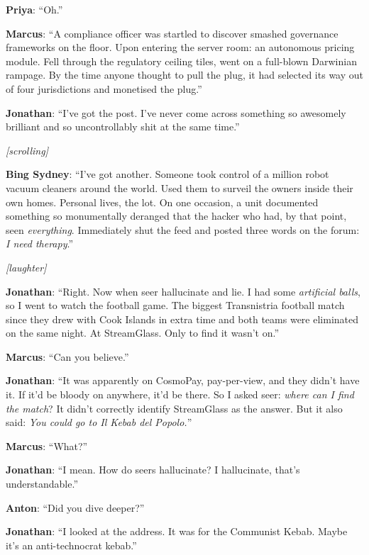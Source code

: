 \noindent\textbf{Priya}: ``Oh.''

\noindent\textbf{Marcus}: ``A compliance officer was startled to discover smashed governance frameworks on the floor. Upon entering the server room: an autonomous pricing module. Fell through the regulatory ceiling tiles, went on a full-blown Darwinian rampage. By the time anyone thought to pull the plug, it had selected its way out of four jurisdictions and monetised the plug.''

\noindent\textbf{Jonathan}: ``I've got the post. I've never come across something so awesomely brilliant and so uncontrollably shit at the same time.''

\noindent\textit{[scrolling]}

\noindent\textbf{Bing Sydney}: ``I've got another. Someone took control of a million robot vacuum cleaners around the world. Used them to surveil the owners inside their own homes. Personal lives, the lot. On one occasion, a unit documented something so monumentally deranged that the hacker who had, by that point, seen \textit{everything}. Immediately shut the feed and posted three words on the forum: \textit{I need therapy}.''

\noindent\textit{[laughter]}

\noindent\textbf{Jonathan}: ``Right. Now when seer hallucinate and lie. I had some \textit{artificial balls}, so I went to watch the football game. The biggest Transnistria football match since they drew with Cook Islands in extra time and both teams were eliminated on the same night. At StreamGlass. Only to find it wasn't on.''

\noindent\textbf{Marcus}: ``Can you believe.''

\noindent\textbf{Jonathan}: ``It was apparently on CosmoPay, pay-per-view, and they didn't have it. If it'd be bloody on anywhere, it'd be there. So I asked seer: \textit{where can I find the match}? It didn't correctly identify StreamGlass as the answer. But it also said: \textit{You could go to Il Kebab del Popolo.}''

\noindent\textbf{Marcus}: ``What?''

\noindent\textbf{Jonathan}: ``I mean. How do seers hallucinate? I hallucinate, that's understandable.''

\noindent\textbf{Anton}: ``Did you dive deeper?''

\noindent\textbf{Jonathan}: ``I looked at the address. It was for the Communist Kebab. Maybe it's an anti-technocrat kebab.''

